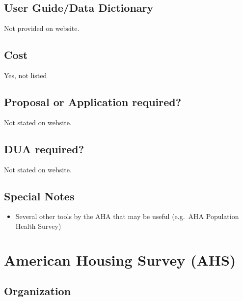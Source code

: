 \documentclass[
]{book}
\providecommand{\tightlist}{%
  \setlength{\itemsep}{0pt}\setlength{\parskip}{0pt}}
\begin{document}
\hypertarget{user-guidedata-dictionary-6}{%
\section{User Guide/Data Dictionary}\label{user-guidedata-dictionary-6}}

Not provided on website.

\hypertarget{cost-6}{%
\section{Cost}\label{cost-6}}

Yes, not listed

\hypertarget{proposal-or-application-required-6}{%
\section{Proposal or Application required?}\label{proposal-or-application-required-6}}

Not stated on website.

\hypertarget{dua-required-6}{%
\section{DUA required?}\label{dua-required-6}}

Not stated on website.

\hypertarget{special-notes-6}{%
\section{Special Notes}\label{special-notes-6}}

\begin{itemize}
\tightlist
\item
  Several other tools by the AHA that may be useful (e.g.~AHA Population Health Survey)
\end{itemize}

\mainmatter

\hypertarget{american-housing-survey-ahs}{%
\chapter{American Housing Survey (AHS)}\label{american-housing-survey-ahs}}

\hypertarget{organization-7}{%
\section{Organization}\label{organization-7}}
\end{document}
